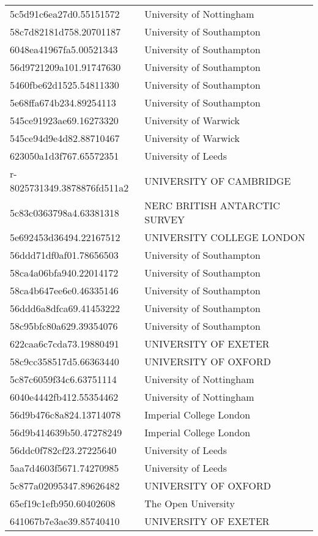 \begin{tabular}{ll}
5c5d91c6ea27d0.55151572 & University of Nottingham \\
58c7d82181d758.20701187 & University of Southampton \\
6048ea41967fa5.00521343 & University of Southampton \\
56d9721209a101.91747630 & University of Southampton \\
5460fbe62d1525.54811330 & University of Southampton \\
5e68ffa674b234.89254113 & University of Southampton \\
545ce91923ae69.16273320 & University of Warwick \\
545ce94d9e4d82.88710467 & University of Warwick \\
623050a1d3f767.65572351 & University of Leeds \\
r-8025731349.3878876fd511a2 & UNIVERSITY OF CAMBRIDGE \\
5c83c0363798a4.63381318 & NERC BRITISH ANTARCTIC SURVEY \\
5e692453d36494.22167512 & UNIVERSITY COLLEGE LONDON \\
56ddd71df0af01.78656503 & University of Southampton \\
58ca4a06bfa940.22014172 & University of Southampton \\
58ca4b647ee6e0.46335146 & University of Southampton \\
56ddd6a8dfca69.41453222 & University of Southampton \\
58c95bfc80a629.39354076 & University of Southampton \\
622caa6c7cda73.19880491 & UNIVERSITY OF EXETER \\
58c9cc358517d5.66363440 & UNIVERSITY OF OXFORD \\
5c87c6059f34c6.63751114 & University of Nottingham \\
6040e4442fb412.55354462 & University of Nottingham \\
56d9b476c8a824.13714078 & Imperial College London \\
56d9b414639b50.47278249 & Imperial College London \\
56ddc0f782cf23.27225640 & University of Leeds \\
5aa7d4603f5671.74270985 & University of Leeds \\
5c877a02095347.89626482 & UNIVERSITY OF OXFORD \\
65ef19c1efb950.60402608 & The Open University \\
641067b7e3ae39.85740410 & UNIVERSITY OF EXETER \\

\end{tabular}
